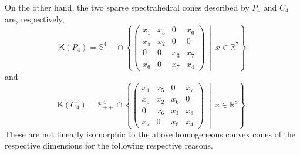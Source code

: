 \documentclass[oneside]{amsart}
\theoremstyle{plain}
\theoremstyle{definition}
\theoremstyle{remark}
\numberwithin{equation}{section}
\begin{document}
On the other hand, the two sparse spectrahedral cones described by $P_{4}$
and $C_{4}$ are, respectively,
\[
\mathsf{K}(P_{4}) = \mathbb{S}^{4}_{++} \cap \left\{
\begin{pmatrix}
x_{1} & x_{5} & 0 & x_{6}
\\
x_{5} & x_{2} & 0 & 0
\\
0 & 0 & x_{3} & x_{7}
\\
x_{6} & 0 & x_{7} & x_{4}
\end{pmatrix}
\ \middle|\ x \in \mathbb{R}^{7}\right\}
\]
and
\[
\mathsf{K}(C_{4}) = \mathbb{S}^{4}_{++} \cap \left\{
\begin{pmatrix}
x_{1} & x_{5} & 0 & x_{7}
\\
x_{5} & x_{2} & x_{6} & 0
\\
0 & x_{6} & x_{3} & x_{8}
\\
x_{7} & 0 & x_{8} & x_{4}
\end{pmatrix}
\ \middle|\ x \in \mathbb{R}^{8}\right\}.
\]
These are not linearly isomorphic to the above homogeneous convex cones of
the respective dimensions for the following respective reasons.
\end{document}
